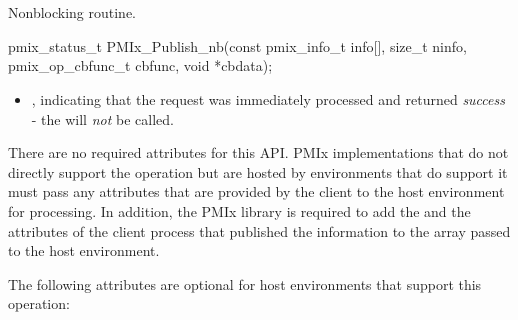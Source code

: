 \section{}

\summary

Nonblocking  routine.

\format

\cspecificstart
\begin{codepar}
pmix_status_t
PMIx_Publish_nb(const pmix_info_t info[], size_t ninfo,
                pmix_op_cbfunc_t cbfunc, void *cbdata);
\end{codepar}
\cspecificend

\begin{arglist}
\end{arglist}

\returnsimplenb

\begin{itemize}
    \item {}, indicating that the request was immediately processed and returned \textit{success} - the  will \textit{not} be called.
\end{itemize}

\reqattrstart
There are no required attributes for this \ac{API}. \ac{PMIx} implementations that do not directly support the operation but are hosted by environments that do support it must pass any attributes that are provided by the client to the host environment for processing. In addition, the \ac{PMIx} library is required to add the  and the  attributes of the client process that published the information to the  array passed to the host environment.

\reqattrend

\optattrstart
The following attributes are optional for host environments that support this operation:



